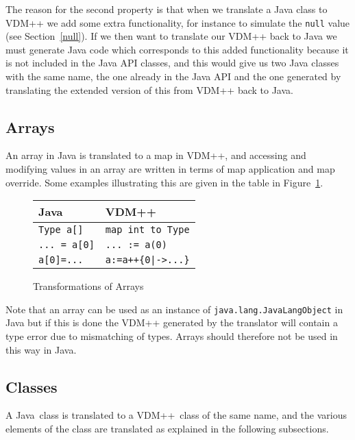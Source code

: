 \documentclass[\pformat,12pt]{article}
\newcommand{\JAVA}{Java}
\newcommand{\VDM}{VDM++}
\begin{document}
The reason for the second property is that when we translate a Java
class to VDM++ we add some extra functionality, for instance to
simulate the \texttt{null} value (see Section~\ref{null}). If we then
want to translate our VDM++ back to Java we must generate Java code
which corresponds to this added functionality because it is not
included in the Java API classes, and this would give us two Java
classes with the same name, the one already in the Java API and the
one generated by translating the extended version of this from VDM++
back to Java.  

\subsection{Arrays}\label{arrays}

An array in Java is translated to a map in VDM++, and accessing and
modifying values in an array are written in terms of map application
and map override. Some examples illustrating this are given in
the table in Figure~\ref{fig:arrayxfs}. 
\newpage
\begin{figure}[htbp]
  \begin{center}
\begin{longtable}{|l|l|}
\hline
  \JAVA\   & \VDM\ \\ \hline \hline
  \texttt{Type a[]}   & \texttt{map int to Type} \\ \hline
  \texttt{... = a[0]}   & \texttt{... := a(0)} \\ \hline
  \texttt{a[0]=...}   & \texttt{a:=a++\{0|->...\}} \\ \hline
\end{longtable}    
    \caption{Transformations of Arrays}
    \label{fig:arrayxfs}
  \end{center}
\end{figure}

Note that an array can be used as an instance of
\texttt{java.lang.JavaLangObject} in Java but if this is done the
VDM++ generated by the translator will contain a type error due to
mismatching of types. Arrays should therefore not be used in this way
in Java. 

\subsection{Classes}\label{class}

A \JAVA\ class is translated to a \VDM\ class of the same name, and
the various elements of the class are translated as explained in the
following subsections.
\end{document}
